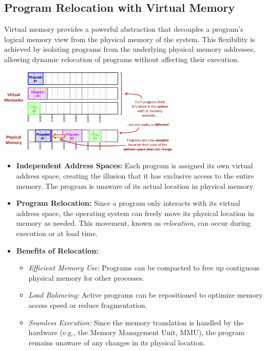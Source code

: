 \subsection{Program Relocation with Virtual Memory}
Virtual memory provides a powerful abstraction that decouples a program's logical memory view from the physical memory of the system. This flexibility is achieved by isolating programs from the underlying physical memory addresses, allowing dynamic relocation of programs without affecting their execution.
\begin{center}
    \includegraphics[width=0.65\textwidth]{chapters/chapter3c/images/virtual.png}
\end{center}
\begin{itemize}
    \item \textbf{Independent Address Spaces:} Each program is assigned its own virtual address space, creating the illusion that it has exclusive access to the entire memory. The program is unaware of its actual location in physical memory.
    \item \textbf{Program Relocation:} Since a program only interacts with its virtual address space, the operating system can freely move its physical location in memory as needed. This movement, known as \textit{relocation}, can occur during execution or at load time.
    \item \textbf{Benefits of Relocation:}
    \begin{itemize}
        \item \textit{Efficient Memory Use:} Programs can be compacted to free up contiguous physical memory for other processes.
        \item \textit{Load Balancing:} Active programs can be repositioned to optimize memory access speed or reduce fragmentation.
        \item \textit{Seamless Execution:} Since the memory translation is handled by the hardware (e.g., the Memory Management Unit, MMU), the program remains unaware of any changes in its physical location.
    \end{itemize}
\end{itemize}


